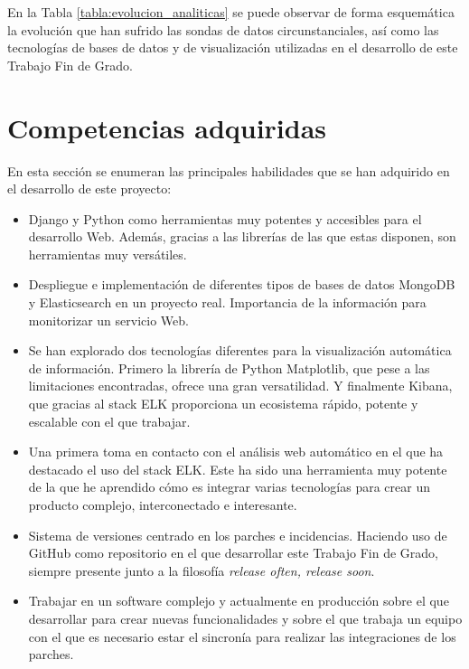 \documentclass[a4paper, 12pt]{book}
\begin{document}
				
		En la Tabla \ref{tabla:evolucion_analiticas} se puede observar de forma esquemática la evolución que han sufrido las sondas de datos circunstanciales, así como las tecnologías de bases de datos y de visualización utilizadas en el desarrollo de este Trabajo Fin de Grado.
	\section{Competencias adquiridas} 
	\label{sec:competencias_adquiridas} 
	
		En esta sección se enumeran las principales habilidades que se han adquirido en el desarrollo de este proyecto:
		\begin{itemize}
			\item Django y Python como herramientas muy potentes y accesibles para el desarrollo Web. Además, gracias a las librerías de las que estas disponen, son herramientas muy versátiles.\\
			
			\item Despliegue e implementación de diferentes tipos de bases de datos MongoDB y Elasticsearch en un proyecto real. Importancia de la información para monitorizar un servicio Web.\\
			
			\item Se han explorado dos tecnologías diferentes para la visualización automática de información. Primero la librería de Python Matplotlib, que pese a las limitaciones encontradas, ofrece una gran versatilidad. Y finalmente Kibana, que gracias al stack ELK proporciona un ecosistema rápido, potente y escalable con el que trabajar. \\
			
			\item Una primera toma en contacto con el análisis web automático en el que ha destacado el uso del stack ELK. Este ha sido una herramienta muy potente de la que he aprendido cómo es integrar varias tecnologías para crear un producto complejo, interconectado e interesante. \\
			
			
			\item Sistema de versiones centrado en los parches e incidencias. Haciendo uso de GitHub como repositorio en el que desarrollar este Trabajo Fin de Grado, siempre presente junto a la filosofía \textit{release often, release soon}. \\
			
			\item Trabajar en un software complejo y actualmente en producción sobre el que desarrollar para crear nuevas funcionalidades y sobre el que trabaja un equipo con el que es necesario estar el sincronía para realizar las integraciones de los parches. \\
			
		\end{itemize}
\end{document}
